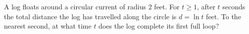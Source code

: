A log floats around a circular current of radius $2$ feet. For $t\ge1$, after $t$ seconds the total distance the log has travelled along the circle is $d=\ln t$ feet. To the nearest second, at what time $t$ does the log complete its first full loop?

